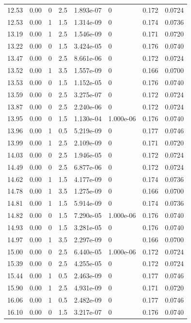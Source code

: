 \documentclass[preview]{standalone}
\begin{document}
{{{\begin{tabular}{L{1.2cm}C{1.2cm} C{0.3cm}C{0.5cm} C{1.4cm}C{1.4cm} C{1.4cm}C{1.4cm}}
  12.53  &  0.00  & 0     & 2.5 &  1.893e-07  & 0  & 0.172 &  0.0724   \\ 
  12.53  &  0.00  & 1     & 1.5 &  1.314e-09  & 0  & 0.174 &  0.0736   \\ 
  13.19  &  0.00  & 1     & 2.5 &  1.546e-09  & 0  & 0.171 &  0.0720   \\ 
  13.22  &  0.00  & 0     & 1.5 &  3.424e-05  & 0  & 0.176 &  0.0740   \\ 
  13.47  &  0.00  & 0     & 2.5 &  8.661e-06  & 0  & 0.172 &  0.0724   \\ 
  13.52  &  0.00  & 1     & 3.5 &  1.557e-09  & 0  & 0.166 &  0.0700   \\ 
  13.53  &  0.00  & 0     & 1.5 &  1.152e-05  & 0  & 0.176 &  0.0740   \\ 
  13.59  &  0.00  & 0     & 2.5 &  3.275e-07  & 0  & 0.172 &  0.0724   \\ 
  13.87  &  0.00  & 0     & 2.5 &  2.240e-06  & 0  & 0.172 &  0.0724   \\ 
  13.95  &  0.00  & 0     & 1.5 &  1.130e-04  & 1.000e-06  & 0.176 &  0.0740   \\ 
  13.96  &  0.00  & 1     & 0.5 &  5.219e-09  & 0  & 0.177 &  0.0746   \\ 
  13.99  &  0.00  & 1     & 2.5 &  2.109e-09  & 0  & 0.171 &  0.0720   \\ 
  14.03  &  0.00  & 0     & 2.5 &  1.946e-05  & 0  & 0.172 &  0.0724   \\ 
  14.49  &  0.00  & 0     & 2.5 &  6.877e-06  & 0  & 0.172 &  0.0724   \\ 
  14.62  &  0.00  & 1     & 1.5 &  4.177e-09  & 0  & 0.174 &  0.0736   \\ 
  14.78  &  0.00  & 1     & 3.5 &  1.275e-09  & 0  & 0.166 &  0.0700   \\ 
  14.81  &  0.00  & 1     & 1.5 &  5.914e-09  & 0  & 0.174 &  0.0736   \\ 
  14.82  &  0.00  & 0     & 1.5 &  7.290e-05  & 1.000e-06  & 0.176 &  0.0740   \\ 
  14.93  &  0.00  & 0     & 1.5 &  3.281e-05  & 0  & 0.176 &  0.0740   \\ 
  14.97  &  0.00  & 1     & 3.5 &  2.297e-09  & 0  & 0.166 &  0.0700   \\ 
  15.00  &  0.00  & 0     & 2.5 &  6.440e-05  & 1.000e-06  & 0.172 &  0.0724   \\ 
  15.39  &  0.00  & 0     & 2.5 &  4.255e-05  & 0  & 0.172 &  0.0724   \\ 
  15.44  &  0.00  & 1     & 0.5 &  2.463e-09  & 0  & 0.177 &  0.0746   \\ 
  15.90  &  0.00  & 1     & 2.5 &  4.931e-09  & 0  & 0.171 &  0.0720   \\ 
  16.06  &  0.00  & 1     & 0.5 &  2.482e-09  & 0  & 0.177 &  0.0746   \\ 
  16.10  &  0.00  & 0     & 1.5 &  3.217e-07  & 0  & 0.176 &  0.0740   \\ 
\hline 
\end{tabular} 

}}}
\end{document}
